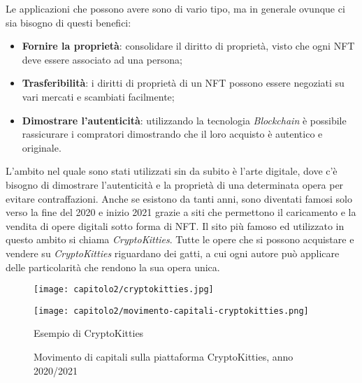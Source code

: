 \noindent Le applicazioni che possono avere sono di vario tipo, ma in generale ovunque ci sia bisogno di questi benefici:
\begin{itemize}
  \item \textbf{Fornire la proprietà}: consolidare il diritto di proprietà, visto che ogni NFT deve essere associato ad una persona;
  \item \textbf{Trasferibilità}: i diritti di proprietà di un NFT possono essere negoziati su vari mercati e scambiati facilmente;
  \item \textbf{Dimostrare l'autenticità}: utilizzando la tecnologia \emph{Blockchain} è possibile rassicurare i compratori dimostrando che il loro acquisto è autentico e originale.
\end{itemize}

L'ambito nel quale sono stati utilizzati sin da subito è l'arte digitale, dove c'è bisogno di dimostrare l'autenticità e la proprietà di una determinata opera per evitare contraffazioni.
Anche se esistono da tanti anni, sono diventati famosi solo verso la fine del 2020 e inizio 2021 grazie a siti che permettono il caricamento e la vendita di opere digitali sotto forma di NFT. Il sito più famoso ed utilizzato in questo ambito si chiama \emph{CryptoKitties}. Tutte le opere che si possono acquistare e vendere su \emph{CryptoKitties} riguardano dei gatti, a cui ogni autore può applicare delle particolarità che rendono la sua opera unica.

\begin{figure}[!tbph]
  
  \centering

  \begin{minipage}{0.5\textwidth}
    \texttt{[image: capitolo2/cryptokitties.jpg]}
  \end{minipage}%
  \begin{minipage}{0.5\textwidth}
    \texttt{[image: capitolo2/movimento-capitali-cryptokitties.png]}
  \end{minipage}

  \begin{minipage}[t]{0.5\textwidth}
    \caption{Esempio di CryptoKitties}
  \end{minipage}%
  \begin{minipage}[t]{0.5\textwidth}
    \caption{Movimento di capitali sulla piattaforma CryptoKitties, anno 2020/2021}
  \end{minipage}
\end{figure}


